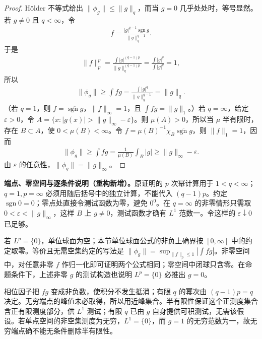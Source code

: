\documentclass[../../main.tex]{subfiles}
\begin{document}
\begin{proof}
Hölder 不等式给出 $\|\phi_g\|\leqslant\|g\|_q$，而当 $g=0$ 几乎处处时，等号显然。若 $g\ne0$ 且 $q<\infty$，令
\begin{align*}
f=\frac{|g|^{q-1}\overline{\operatorname{sgn}g}}{\|g\|_q^{q-1}}.
\end{align*}
于是
\begin{align*}
\|f\|_p^p=\frac{\int|g|^{(q-1)p}}{\|g\|_q^{(q-1)p}}
=\frac{\int|g|^q}{\int|g|^q}=1,
\end{align*}
所以
\begin{align*}
\|\phi_g\|\geqslant\int fg=\frac{\int|g|^q}{\|g\|_q^{q-1}}=\|g\|_q.
\end{align*}
（若 $q=1$，则 $f=\overline{\operatorname{sgn}g}$，$\|f\|_\infty=1$，且 $\int fg=\|g\|_1$。）若 $q=\infty$，给定 $\varepsilon>0$，令 $A=\{x:|g(x)|>\|g\|_\infty-\varepsilon\}$。则 $\mu(A)>0$，所以当 $\mu$ 半有限时，存在 $B\subset A$，使 $0<\mu(B)<\infty$。令 $f=\mu(B)^{-1}\chi_B\overline{\operatorname{sgn}g}$，则 $\|f\|_1=1$，因而
\begin{align*}
\|\phi_g\|\geqslant\int fg=\frac{1}{\mu(B)}\int_B|g|\geqslant\|g\|_\infty-\varepsilon.
\end{align*}
由 $\varepsilon$ 的任意性，$\|\phi_g\|=\|g\|_\infty$。
\end{proof}
\begin{remark}
\textbf{端点、零空间与逐条件说明（重构新增）。}原证明的 $p$ 次幂计算用于 $1<q<\infty$；$q=1,p=\infty$ 必须用随后括号中的独立计算，不能代入 $(q-1)p$。约定 $\operatorname{sgn}0=0$；零点处直接令测试函数为零，避免 $0^0$。在 $q=\infty$ 的非零情形只需取 $0<\varepsilon<\|g\|_\infty$，这样 $B$ 上 $g\ne0$，测试函数才确有 $L^1$ 范数一。令这样的 $\varepsilon\downarrow0$ 已足够。

若 $L^p=\{0\}$，单位球面为空；本节单位球面公式的非负上确界按 $[0,\infty]$ 中的约定取零。等价且无需空集约定的写法是 $\|\phi_g\|=\sup_{\|f\|_p\leqslant1}|\int fg|$。非零空间中，对任意非零 $f$ 作归一化即可证明两个公式相同；零空间中闭球只含零。在命题条件下，上述非零 $g$ 的测试构造也说明 $L^p=\{0\}$ 必推出 $g=0$。

相位因子把 $fg$ 变成非负数，使积分不发生抵消；有限 $q$ 的幂次由 $(q-1)p=q$ 决定。无穷端点的峰值未必取得，所以用近峰集合。半有限性保证这个正测度集合含正有限测度部分，供 $L^1$ 测试；有限 $q$ 已由 $g$ 自身提供可积测试，无需该假设。若单点空间的非空集测度为无穷，$L^1=\{0\}$，而 $g=1$ 的无穷范数为一，故无穷端点确不能无条件删除半有限性。
\end{remark}
\end{document}
